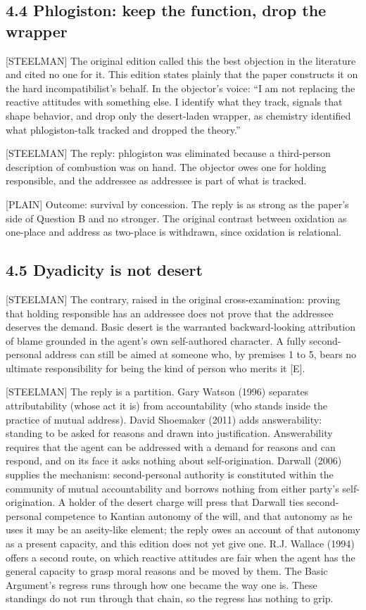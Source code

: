 \documentclass[11pt]{article}
\newcommand{\register}[1]{{\ttfamily\small #1}}
\begin{document}
\subsection*{4.4 Phlogiston: keep the function, drop the wrapper}

\register{[STEELMAN]} The original edition called this the best objection in the literature and cited no one for it. This edition states plainly that the paper constructs it on the hard incompatibilist's behalf. In the objector's voice: ``I am not replacing the reactive attitudes with something else. I identify what they track, signals that shape behavior, and drop only the desert-laden wrapper, as chemistry identified what phlogiston-talk tracked and dropped the theory.''

\register{[STEELMAN]} The reply: phlogiston was eliminated because a third-person description of combustion was on hand. The objector owes one for holding responsible, and the addressee as addressee is part of what is tracked.

\register{[PLAIN]} Outcome: survival by concession. The reply is as strong as the paper's side of Question B and no stronger. The original contrast between oxidation as one-place and address as two-place is withdrawn, since oxidation is relational.

\subsection*{4.5 Dyadicity is not desert}

\register{[STEELMAN]} The contrary, raised in the original cross-examination: proving that holding responsible has an addressee does not prove that the addressee deserves the demand. Basic desert is the warranted backward-looking attribution of blame grounded in the agent's own self-authored character. A fully second-personal address can still be aimed at someone who, by premises 1 to 5, bears no ultimate responsibility for being the kind of person who merits it [E].

\register{[STEELMAN]} The reply is a partition. Gary Watson (1996) separates attributability (whose act it is) from accountability (who stands inside the practice of mutual address). David Shoemaker (2011) adds answerability: standing to be asked for reasons and drawn into justification. Answerability requires that the agent can be addressed with a demand for reasons and can respond, and on its face it asks nothing about self-origination. Darwall (2006) supplies the mechanism: second-personal authority is constituted within the community of mutual accountability and borrows nothing from either party's self-origination. A holder of the desert charge will press that Darwall ties second-personal competence to Kantian autonomy of the will, and that autonomy as he uses it may be an aseity-like element; the reply owes an account of that autonomy as a present capacity, and this edition does not yet give one. R.J. Wallace (1994) offers a second route, on which reactive attitudes are fair when the agent has the general capacity to grasp moral reasons and be moved by them. The Basic Argument's regress runs through how one became the way one is. These standings do not run through that chain, so the regress has nothing to grip.
\end{document}
